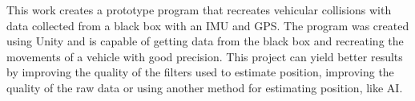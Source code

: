 This work creates a prototype program that recreates vehicular collisions with data collected from a black box with an IMU and GPS. The program was created using Unity and is capable of getting data from the black box and recreating the movements of a vehicle with good precision. This project can yield better results by improving the quality of the filters used to estimate position, improving the quality of the raw data or using another method for estimating position, like AI.
